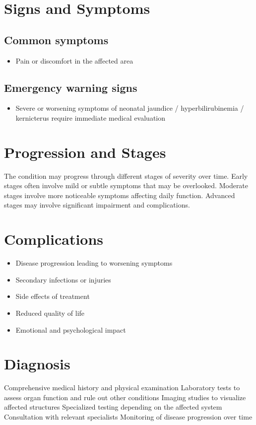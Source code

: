 \section{Signs and Symptoms}

\subsection{Common symptoms}
\begin{itemize}[noitemsep]
  \item Pain or discomfort in the affected area
  \end{itemize}

\subsection{Emergency warning signs}
\begin{itemize}[noitemsep]
  \item Severe or worsening symptoms of neonatal jaundice / hyperbilirubinemia / kernicterus require immediate medical evaluation
\end{itemize}
\section{Progression and Stages}
The condition may progress through different stages of severity over time. Early stages often involve mild or subtle symptoms that may be overlooked. Moderate stages involve more noticeable symptoms affecting daily function. Advanced stages may involve significant impairment and complications.
\section{Complications}
\begin{itemize}[noitemsep]
  \item Disease progression leading to worsening symptoms
  \item Secondary infections or injuries
  \item Side effects of treatment
  \item Reduced quality of life
  \item Emotional and psychological impact
\end{itemize}
\section{Diagnosis}
Comprehensive medical history and physical examination Laboratory tests to assess organ function and rule out other conditions Imaging studies to visualize affected structures Specialized testing depending on the affected system Consultation with relevant specialists Monitoring of disease progression over time


